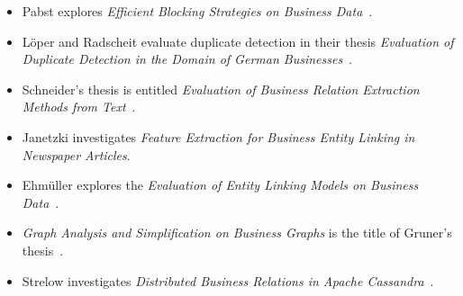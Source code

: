 \begin{itemize}
\itemsep-0.1cm
\setlength{\itemindent}{-.1in}
\item Pabst explores \emph{Efficient Blocking Strategies on Business Data}~\cite{pabst}.
\item Löper and Radscheit evaluate duplicate detection in their thesis \emph{Evaluation of Duplicate Detection in the Domain of German Businesses}~\cite{loeperradscheit}.
\item Schneider's thesis is entitled \emph{Evaluation of Business Relation Extraction Methods from Text}~\cite{schneider}.
\item Janetzki investigates \emph{Feature Extraction for Business Entity Linking in Newspaper Articles}.
\item Ehmüller explores the \emph{Evaluation of Entity Linking Models on Business Data}~\cite{ehmueller}.
\item \emph{Graph Analysis and Simplification on Business Graphs} is the title of Gruner's thesis~\cite{gruner}.
\item Strelow investigates \emph{Distributed Business Relations in Apache Cassandra}~\cite{strelow}.
\end{itemize}
